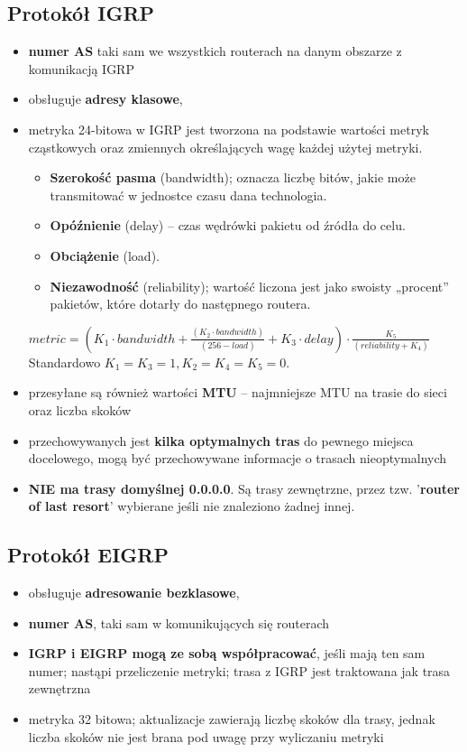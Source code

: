 \documentclass[../main.tex]{subfiles}
\begin{document}
    \subsection{Protokół IGRP}
    \begin{itemize}
        \item \textbf{numer AS} taki sam
        we wszystkich routerach na danym obszarze z komunikacją IGRP
        \item obsługuje \textbf{adresy klasowe},
        \item metryka 24-bitowa w IGRP jest tworzona na podstawie wartości metryk cząstkowych oraz zmiennych
        określających wagę każdej użytej metryki.
        \begin{itemize}
            \item \textbf{Szerokość pasma} (bandwidth); oznacza liczbę bitów, jakie może transmitować w
            jednostce czasu dana technologia.
            \item \textbf{Opóźnienie} (delay) – czas wędrówki pakietu od źródła do celu.
            \item \textbf{Obciążenie} (load).
            \item \textbf{Niezawodność} (reliability); wartość liczona jest jako swoisty
            „procent” pakietów, które dotarły do następnego routera.
        \end{itemize}
        $metric = (K_1 \cdot bandwidth + \frac{(K_2\cdot bandwidth)}{(256 - load)} + K_3 \cdot delay) \cdot
        \frac{K_5}{(reliability + K_4)}$
        Standardowo $K_1 = K_3 = 1, K_2 = K_4 = K_5 = 0$.
        \item przesyłane są również wartości \textbf{MTU} – najmniejsze MTU na trasie do sieci oraz liczba skoków
        \item przechowywanych jest \textbf{kilka optymalnych tras} do pewnego miejsca docelowego, mogą być przechowywane informacje o trasach nieoptymalnych
        \item \textbf{NIE ma trasy domyślnej 0.0.0.0}. Są trasy zewnętrzne, przez tzw. '\textbf{router of last resort}'
        wybierane jeśli nie znaleziono żadnej innej.
    \end{itemize}

    \subsection{Protokół EIGRP}
    \begin{itemize}
        \item obsługuje \textbf{adresowanie bezklasowe},
        \item \textbf{numer AS}, taki sam w komunikujących
        się routerach
        \item \textbf{IGRP i EIGRP mogą ze sobą współpracować}, jeśli mają ten sam numer; nastąpi przeliczenie metryki;
        trasa z IGRP jest traktowana jak trasa zewnętrzna
        \item metryka 32 bitowa; aktualizacje zawierają liczbę skoków dla
        trasy, jednak liczba skoków nie jest brana pod uwagę przy wyliczaniu metryki
    \end{itemize}
\end{document}
